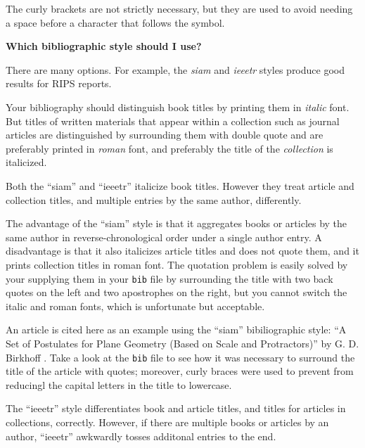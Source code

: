 \begin{enumerate}
The curly brackets are not strictly necessary, but they are used to avoid needing a space before a character that follows the symbol.  

{\bf Which bibliographic style should I use? }

There are many options. 
For example, the \emph{siam} and \emph{ieeetr} styles produce good results for RIPS reports.

\hspace{15pt}Your bibliography should distinguish book titles by printing them in \emph{italic} font.  But titles of written materials that appear within a collection such as journal articles are distinguished by surrounding them with double quote and  are preferably printed in \emph{roman} font, and preferably the title of the \emph{collection} is italicized.

\hspace{15pt}Both the ``siam'' and ``ieeetr'' italicize book titles.
However they treat article and collection titles, and multiple entries by the same author, differently.

\hspace{15pt}The advantage of the ``siam'' style is that it aggregates books or articles by the same author in reverse-chronological order under a single author entry.  
A disadvantage is that it also italicizes article titles and does not quote them, and it prints collection titles in roman font.
The quotation problem is easily solved by your supplying them in your \texttt{bib} file by surrounding the title with two back quotes on the left and two apostrophes on the right, but you cannot switch the italic and roman fonts, which is unfortunate but acceptable.

\hspace{15pt}An article is cited here as an example using the ``siam'' bibiliographic style: ``A Set of Postulates for Plane Geometry (Based on Scale and Protractors)'' by G. D. Birkhoff \cite{Birkhoff:1932}.
Take a look at the \texttt{bib} file to see how it was necessary to surround the title of the article  with quotes;  moreover, curly braces were used to prevent  {\BibTeX} from reducingl the capital letters in the title to lowercase.

\hspace{15pt}The ``ieeetr'' style differentiates book and article titles, and titles for articles in collections, correctly. 
However, if there are multiple books or articles by an author, ``ieeetr'' awkwardly tosses additonal entries to the end. 


\end{enumerate}
